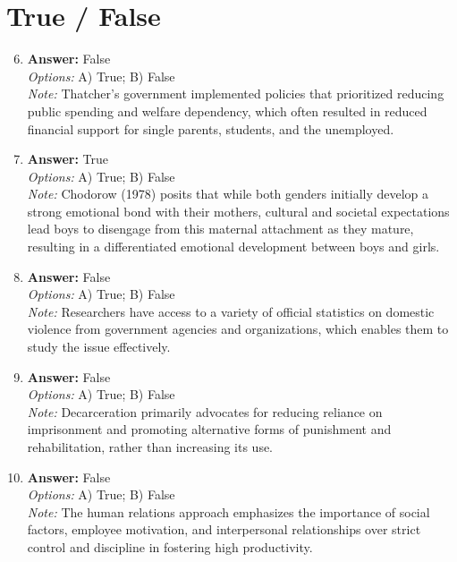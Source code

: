 \documentclass[12pt]{article}
\begin{document}
\section*{True / False}
\begin{enumerate}[label=\arabic*.]
\setcounter{enumi}{5}
\item \textbf{Answer:} False
\\ \textit{Options:} A) True; B) False
\\ \textit{Note:} Thatcher's government implemented policies that prioritized reducing public spending and welfare dependency, which often resulted in reduced financial support for single parents, students, and the unemployed.
\item \textbf{Answer:} True
\\ \textit{Options:} A) True; B) False
\\ \textit{Note:} Chodorow (1978) posits that while both genders initially develop a strong emotional bond with their mothers, cultural and societal expectations lead boys to disengage from this maternal attachment as they mature, resulting in a differentiated emotional development between boys and girls.
\item \textbf{Answer:} False
\\ \textit{Options:} A) True; B) False
\\ \textit{Note:} Researchers have access to a variety of official statistics on domestic violence from government agencies and organizations, which enables them to study the issue effectively.
\item \textbf{Answer:} False
\\ \textit{Options:} A) True; B) False
\\ \textit{Note:} Decarceration primarily advocates for reducing reliance on imprisonment and promoting alternative forms of punishment and rehabilitation, rather than increasing its use.
\item \textbf{Answer:} False
\\ \textit{Options:} A) True; B) False
\\ \textit{Note:} The human relations approach emphasizes the importance of social factors, employee motivation, and interpersonal relationships over strict control and discipline in fostering high productivity.
\end{enumerate}
\end{document}
